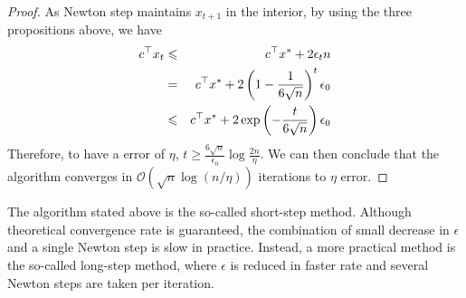 \begin{proof}
As Newton step maintains $x_{t+1}$ in the interior, by using the three propositions above, we have 
\begin{eqnarray}
c^\top x_t&\leqslant&{c^\top x^*+2\epsilon_t{n}}\nonumber\\
&=&{c^\top x^*+2\left(1-\frac{1}{6\sqrt{n}}\right)^t\epsilon_0}\nonumber\\
&\leqslant&{c^\top x^*+2\exp\left(-\frac{t}{6\sqrt{n}}\right)\epsilon_0}
\end{eqnarray}
Therefore, to have a error of $\eta$, $t\geqslant{\frac{6\sqrt{n}}{\epsilon_0}}\log{\frac{2n}{\eta}}$. We can then conclude that the algorithm converges in  $\mathcal{O}(\sqrt{n}\log(n/\eta))$ iterations to $\eta$ error. 
\end{proof}

The algorithm stated above is the so-called short-step method. Although theoretical convergence rate is guaranteed, the combination of small decrease in $\epsilon$ and a single Newton step is slow in practice. Instead, a more practical method is the so-called long-step method, where $\epsilon$ is reduced in faster rate and several Newton steps are taken per iteration.
